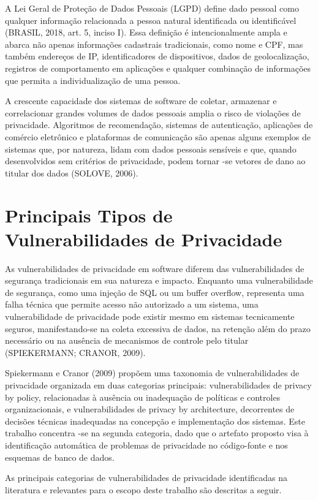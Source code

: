\documentclass[oneside]{normas-utf-tex}
\begin{document}
A Lei Geral de Proteção de Dados Pessoais (LGPD) define dado pessoal como qualquer informação relacionada a pessoa natural identificada ou identificável (BRASIL, 2018, art. 5, inciso I). Essa definição é intencionalmente ampla e abarca não apenas informações cadastrais tradicionais, como nome e CPF, mas também endereços de IP, identificadores de dispositivos, dados de geolocalização, registros de comportamento em aplicações e qualquer combinação de informações que permita a individualização de uma pessoa.

A crescente capacidade dos sistemas de software de coletar, armazenar e correlacionar grandes volumes de dados pessoais amplia o risco de violações de privacidade. Algoritmos de recomendação, sistemas de autenticação, aplicações de comércio eletrônico e plataformas de comunicação são apenas alguns exemplos de sistemas que, por natureza, lidam com dados pessoais sensíveis e que, quando desenvolvidos sem critérios de privacidade, podem tornar -se vetores de dano ao titular dos dados (SOLOVE, 2006).

\section{Principais Tipos de Vulnerabilidades de Privacidade}

As vulnerabilidades de privacidade em software diferem das vulnerabilidades de segurança tradicionais em sua natureza e impacto. Enquanto uma vulnerabilidade de segurança, como uma injeção de SQL ou um buffer overflow, representa uma falha técnica que permite acesso não autorizado a um sistema, uma vulnerabilidade de privacidade pode existir mesmo em sistemas tecnicamente seguros, manifestando-se na coleta excessiva de dados, na retenção além do prazo necessário ou na ausência de mecanismos de controle pelo titular (SPIEKERMANN; CRANOR, 2009).

Spiekermann e Cranor (2009) propõem uma taxonomia de vulnerabilidades de privacidade organizada em duas categorias principais: vulnerabilidades de privacy by policy, relacionadas à ausência ou inadequação de políticas e controles organizacionais, e vulnerabilidades de privacy by architecture, decorrentes de decisões técnicas inadequadas na concepção e implementação dos sistemas. Este trabalho concentra -se na segunda categoria, dado que o artefato proposto visa à identificação automática de problemas de privacidade no código-fonte e nos esquemas de banco de dados.

As principais categorias de vulnerabilidades de privacidade identificadas na literatura e relevantes para o escopo deste trabalho são descritas a seguir.
\end{document}

